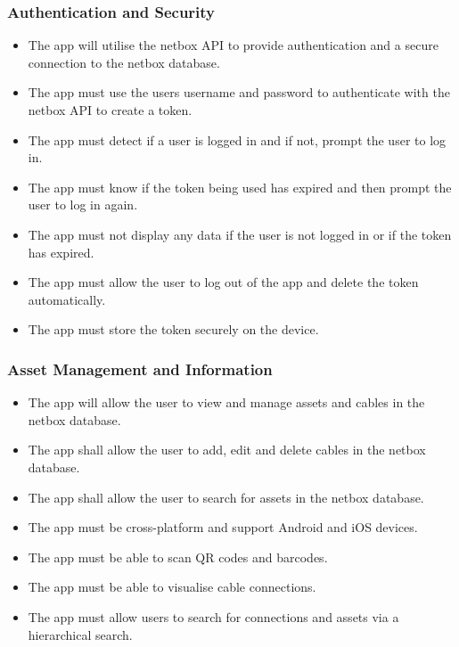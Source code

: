 \documentclass [11pt,a4paper]{article}
\begin{document}
\subsubsection{Authentication and Security}
\begin{itemize}
    \item The app will utilise the netbox API to provide authentication and a secure connection to the netbox database.
    \item The app must use the users username and password to authenticate with the netbox API to create a token.
    \item The app must detect if a user is logged in and if not, prompt the user to log in.
    \item The app must know if the token being used has expired and then prompt the user to log in again.
    \item The app must not display any data if the user is not logged in or if the token has expired.
    \item The app must allow the user to log out of the app and delete the token automatically.
    \item The app must store the token securely on the device.
    
\end{itemize}

\subsubsection{Asset Management and Information}
\begin{itemize}
    \item The app will allow the user to view and manage assets and cables in the netbox database.
    \item The app shall allow the user to add, edit and delete cables in the netbox database.
    \item The app shall allow the user to search for assets in the netbox database.
    \item The app must be cross-platform and support Android and iOS devices.
    \item The app must be able to scan QR codes and barcodes. 
    \item The app must be able to visualise cable connections.
    \item The app must allow users to search for connections and assets via a hierarchical search.
\end{itemize}
\end{document}
